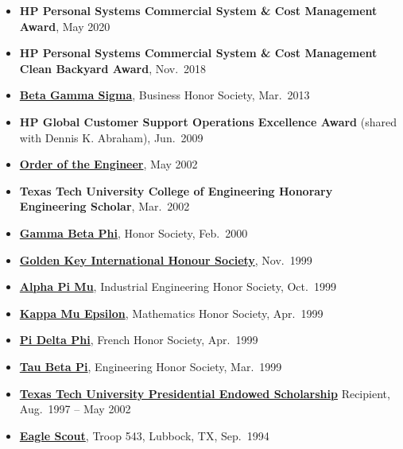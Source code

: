 \documentclass[
]{article}
\providecommand{\tightlist}{%
  \setlength{\itemsep}{0pt}\setlength{\parskip}{0pt}}
\begin{document}
\begin{itemize}
\tightlist
\item
  \textbf{HP Personal Systems Commercial System \& Cost Management
  Award}, May 2020
\item
  \textbf{HP Personal Systems Commercial System \& Cost Management Clean
  Backyard Award}, Nov.~2018
\item
  \href{https://www.betagammasigma.org/}{\textbf{Beta Gamma Sigma}},
  Business Honor Society, Mar.~2013
\item
  \textbf{HP Global Customer Support Operations Excellence Award}
  (shared with Dennis K. Abraham), Jun.~2009
\item
  \href{http://www.order-of-the-engineer.org/}{\textbf{Order of the
  Engineer}}, May 2002
\item
  \textbf{Texas Tech University College of Engineering Honorary
  Engineering Scholar}, Mar.~2002
\item
  \href{https://www.gammabetaphi.org/}{\textbf{Gamma Beta Phi}}, Honor
  Society, Feb.~2000
\item
  \href{https://www.goldenkey.org/}{\textbf{Golden Key International
  Honour Society}}, Nov.~1999
\item
  \href{https://alphapimu.com/}{\textbf{Alpha Pi Mu}}, Industrial
  Engineering Honor Society, Oct.~1999
\item
  \href{http://www.kappamuepsilon.org/}{\textbf{Kappa Mu Epsilon}},
  Mathematics Honor Society, Apr.~1999
\item
  \href{https://www.pideltaphi.org/}{\textbf{Pi Delta Phi}}, French
  Honor Society, Apr.~1999
\item
  \href{https://www.tbp.org/}{\textbf{Tau Beta Pi}}, Engineering Honor
  Society, Mar.~1999
\item
  \href{https://www.depts.ttu.edu/scholarships/incFreshman.php}{\textbf{Texas
  Tech University Presidential Endowed Scholarship}} Recipient,
  Aug.~1997 -- May 2002
\item
  \href{http://www.eaglescout.org/}{\textbf{Eagle Scout}}, Troop 543,
  Lubbock, TX, Sep.~1994
\end{itemize}
\end{document}
